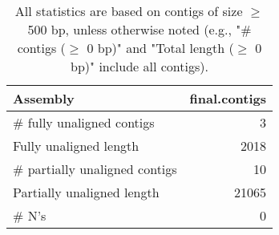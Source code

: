 \documentclass[12pt,a4paper]{article}
\begin{document}
\begin{table}[ht]
\begin{center}
\caption{All statistics are based on contigs of size $\geq$ 500 bp, unless otherwise noted (e.g., "\# contigs ($\geq$ 0 bp)" and "Total length ($\geq$ 0 bp)" include all contigs).}
\begin{tabular}{|l*{1}{|r}|}
\hline
Assembly & final.contigs \\ \hline
\# fully unaligned contigs & 3 \\ \hline
Fully unaligned length & 2018 \\ \hline
\# partially unaligned contigs & 10 \\ \hline
Partially unaligned length & 21065 \\ \hline
\# N's & 0 \\ \hline
\end{tabular}
\end{center}
\end{table}
\end{document}
